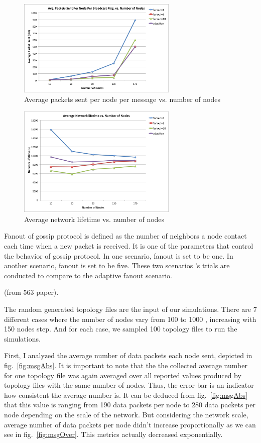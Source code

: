 \begin{figure}
	\centering
	\includegraphics[width=3in]{overhead.png}
	\caption{Average packets sent per node per message vs. number of nodes}
	\label{fig:overhead}
\end{figure}

\begin{figure}
	\centering
	\includegraphics[width=3in]{life.png}
	\caption{Average network lifetime vs. number of nodes}
	\label{fig:life}
\end{figure}



Fanout of gossip protocol is defined as the number of neighbors a node contact each time when a new packet is received. It is one of the parameters that control the behavior of gossip protocol. In one scenario, fanout is set to be one. In another scenario, fanout is set to be five. These two scenarios 's trials are conducted to compare to the adaptive fanout scenario. 

(from 563 paper).

The random generated topology files are the input of our simulations. There are 7 different cases where the number of nodes vary from 100 to 1000 , increasing with 150 nodes step. And for each case, we sampled 100 topology files to run the simulations.

First, I analyzed the average number of data packets each node sent, depicted in fig.~\ref{fig:msgAbs}. It is important to note that the the collected average number for one topology file was again averaged over all reported values produced by topology files with the same number of nodes. Thus, the error bar is an indicator how consistent the average number is. It can be deduced from fig.~\ref{fig:msgAbs} that this value is ranging from 190 data packets per node to 280 data packets per node depending on the scale of the network. But considering the network scale, average number of data packets per node didn't increase proportionally as we can see in fig.~\ref{fig:msgOver}. This metrics actually decreased exponentially. 

